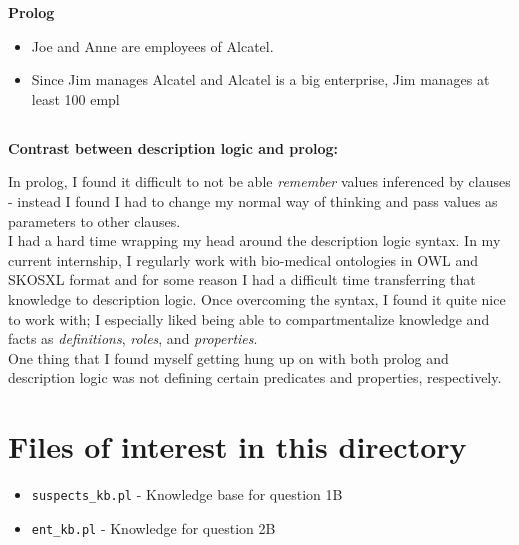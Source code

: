 \documentclass[11pt]{article}
\begin{document}
\textbf{Prolog}
\begin{itemize}
    \item Joe and Anne are employees of Alcatel. 
    \item Since Jim manages Alcatel and Alcatel is a big enterprise, Jim manages at least 100 empl         

\end{itemize}

\subsection{}
\textbf{Contrast between description logic and prolog:}

In prolog, I found it difficult to not be able \textit{remember} values inferenced by clauses - instead I found I had to change my normal way of thinking and pass values as parameters to other clauses. \\ 

I had a hard time wrapping my head around the description logic syntax. In my current internship, I regularly work with bio-medical ontologies in OWL and SKOSXL format and for some reason I had a difficult time transferring that knowledge to description logic. Once overcoming the syntax, I found it quite nice to work with; I especially liked being able to compartmentalize knowledge and facts as \textit{definitions}, \textit{roles}, and \textit{properties}. \\ 

One thing that I found myself getting hung up on with both prolog and description logic was not defining certain predicates and properties, respectively. \\ 

\section{Files of interest in this directory}
\begin{itemize}
\item \texttt{suspects\_kb.pl} - Knowledge base  for question 1B 
\item \texttt{ent\_kb.pl} - Knowledge for question 2B

\end{itemize}
\end{document}
